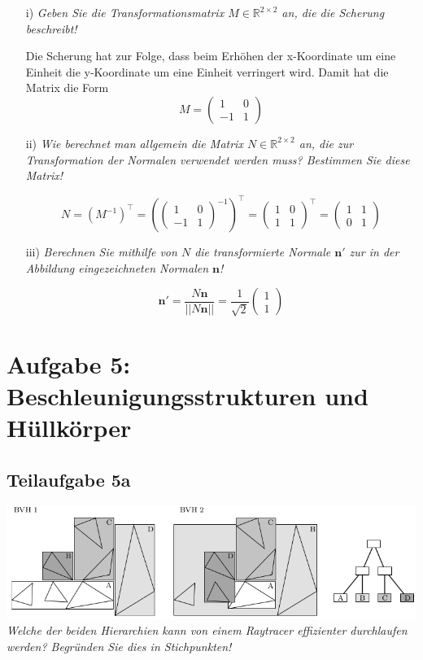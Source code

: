 \documentclass[a4paper]{scrartcl}
\begin{document}
\begin{itemize}
\item[i)] \textit{Geben Sie die Transformationsmatrix $M\in \mathbb{R}^{2\times 2}$ an, die die Scherung beschreibt!}

Die Scherung hat zur Folge, dass beim Erhöhen der x-Koordinate um eine Einheit die y-Koordinate um eine Einheit verringert wird. Damit hat die Matrix die Form
$$M=\begin{pmatrix}
1&0\\-1&1
\end{pmatrix}$$
\item[ii)] \textit{Wie berechnet man allgemein die Matrix $N \in \mathbb{R}^{2\times 2}$ an, die zur Transformation
der Normalen verwendet werden muss? Bestimmen Sie diese Matrix!}

$$N = (M^{-1})^\top = \left(\begin{pmatrix}
1&0\\-1&1
\end{pmatrix}^{-1}\right)^{\top} = \begin{pmatrix}
1&0\\1&1
\end{pmatrix}^{\top} = \begin{pmatrix}
1&1\\0&1
\end{pmatrix}$$

\item[iii)] \textit{Berechnen Sie mithilfe von $N$ die transformierte Normale $\mathbf{n'}$ zur in der Abbildung
eingezeichneten Normalen $\mathbf{n}$!}

$$\mathbf{n'} = \frac{N\mathbf{n}}{||N\mathbf{n}||} = \frac{1}{\sqrt{2}}\begin{pmatrix}
1\\1
\end{pmatrix}$$
\end{itemize}

\section*{Aufgabe 5: Beschleunigungsstrukturen und Hüllkörper}
\subsection*{Teilaufgabe 5a}
\includegraphics*[width=\linewidth, keepaspectratio]{5a.png}
\textit{Welche der beiden Hierarchien kann von einem Raytracer effizienter
durchlaufen werden? Begründen Sie dies in Stichpunkten!}
\end{document}
